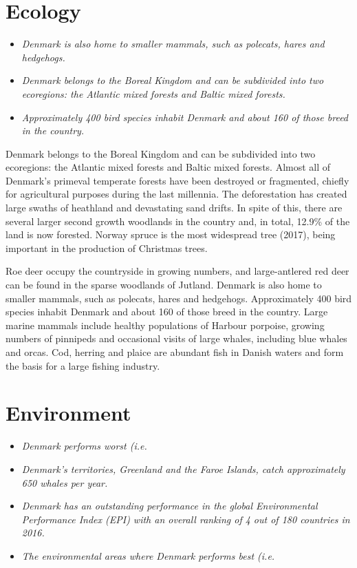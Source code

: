 \section{Ecology}\label{ecology}

\begin{itemize}
\item
  \emph{Denmark is also home to smaller mammals, such as polecats, hares
  and hedgehogs.}
\item
  \emph{Denmark belongs to the Boreal Kingdom and can be subdivided into
  two ecoregions: the Atlantic mixed forests and Baltic mixed forests.}
\item
  \emph{Approximately 400 bird species inhabit Denmark and about 160 of
  those breed in the country.}
\end{itemize}

Denmark belongs to the Boreal Kingdom and can be subdivided into two
ecoregions: the Atlantic mixed forests and Baltic mixed forests. Almost
all of Denmark's primeval temperate forests have been destroyed or
fragmented, chiefly for agricultural purposes during the last millennia.
The deforestation has created large swaths of heathland and devastating
sand drifts. In spite of this, there are several larger second growth
woodlands in the country and, in total, 12.9\% of the land is now
forested. Norway spruce is the most widespread tree (2017), being
important in the production of Christmas trees.

Roe deer occupy the countryside in growing numbers, and large-antlered
red deer can be found in the sparse woodlands of Jutland. Denmark is
also home to smaller mammals, such as polecats, hares and hedgehogs.
Approximately 400 bird species inhabit Denmark and about 160 of those
breed in the country. Large marine mammals include healthy populations
of Harbour porpoise, growing numbers of pinnipeds and occasional visits
of large whales, including blue whales and orcas. Cod, herring and
plaice are abundant fish in Danish waters and form the basis for a large
fishing industry.

\section{Environment}\label{environment}

\begin{itemize}
\item
  \emph{Denmark performs worst (i.e.}
\item
  \emph{Denmark's territories, Greenland and the Faroe Islands, catch
  approximately 650 whales per year.}
\item
  \emph{Denmark has an outstanding performance in the global
  Environmental Performance Index (EPI) with an overall ranking of 4 out
  of 180 countries in 2016.}
\item
  \emph{The environmental areas where Denmark performs best (i.e.}
\end{itemize}


